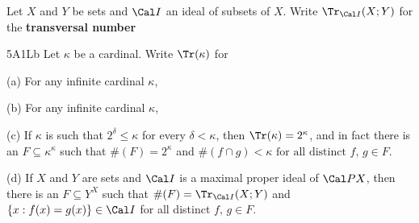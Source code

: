  Let $X$ and $Y$ be sets and
$\Cal I$ an ideal of subsets of $X$.   Write
$\Tr_{\Cal I}(X;Y)$ for the {\bf transversal number}


\spheader 5A1Lb Let $\kappa$ be a cardinal.  Write
$\Tr(\kappa)$ for


 (a) For any infinite cardinal $\kappa$,


(b) For any infinite cardinal $\kappa$,


(c) If $\kappa$ is such that $2^{\delta}\le\kappa$ for
every $\delta<\kappa$, then $\Tr(\kappa)=2^{\kappa}$, and in fact there is
an $F\subseteq\kappa^{\kappa}$ such that $\#(F)=2^{\kappa}$ and
$\#(f\cap g)<\kappa\text{ for all distinct }f,\,g\in F$.

(d) If $X$ and $Y$ are sets and $\Cal I$ is a maximal proper
ideal of $\Cal PX$, then there is
an $F\subseteq Y^X$ such that $\#(F)=\Tr_{\Cal I}(X;Y)$ and
$\{x:f(x)=g(x)\}\in\Cal I$ for all distinct $f,\,g\in F$.

